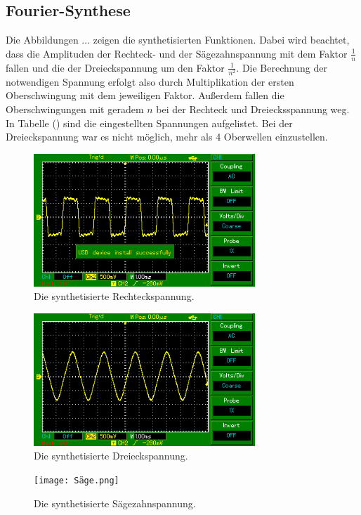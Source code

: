 \subsection{Fourier-Synthese}
Die Abbildungen ... zeigen die synthetisierten Funktionen. Dabei wird beachtet,
dass die Amplituden der Rechteck- und der Sägezahnspannung mit dem Faktor $\frac{1}{n}$ fallen
und die der Dreieckspannung um den Faktor $\frac{1}{n^2}$. Die Berechnung der notwendigen Spannung erfolgt also durch
Multiplikation der ersten Oberschwingung mit dem jeweiligen Faktor.
Außerdem fallen die Oberschwingungen mit geradem $n$
bei der Rechteck und Dreiecksspannung weg. In Tabelle () sind die eingestellten Spannungen aufgelistet.
Bei der Dreieckspannung war es nicht möglich, mehr als 4 Oberwellen einzustellen.
\begin{figure}
  \centering
  \includegraphics[height=5cm]{rechteck.png}
  \caption{Die synthetisierte Rechteckspannung.}
  \label{fig:rechteck}
\end{figure}
\begin{figure}
  \centering
  \includegraphics[height=5cm]{Dreieck.png}
  \caption{Die synthetisierte Dreieckspannung.}
  \label{fig:rechteck}
\end{figure}
\begin{figure}
  \centering
  \texttt{[image: Säge.png]}
  \caption{Die synthetisierte Sägezahnspannung.}
  \label{fig:rechteck}
\end{figure}



